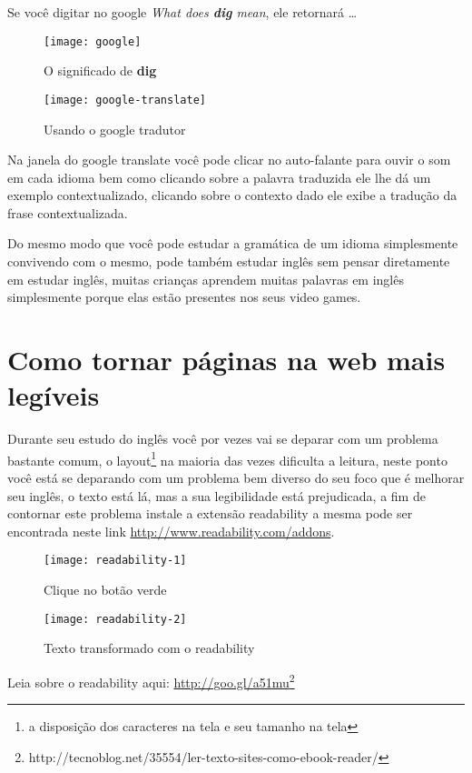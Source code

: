 \newpage
\noindent
Se você digitar no google {\em What does {\bf dig} mean}, ele retornará \dots

\begin{figure}[h!]
	\centering
	\caption {O significado de {\bf dig}}
	\texttt{[image: google]}
\end{figure}

\begin{figure}[h!]
	\centering
	\caption{Usando o google tradutor}
	\texttt{[image: google-translate]}
\end{figure}

\noindent
Na janela do google translate você pode clicar no auto-falante para ouvir
o som em cada idioma bem como clicando sobre a palavra traduzida ele lhe
dá um exemplo contextualizado, clicando sobre o contexto dado ele exibe
a tradução da frase contextualizada.

Do mesmo modo que você pode estudar a gramática de um idioma simplesmente
convivendo com o mesmo, pode também estudar inglês sem pensar diretamente em
estudar inglês, muitas crianças aprendem muitas palavras em inglês simplesmente
porque elas estão presentes nos seus video games.

\section{Como tornar páginas na web mais legíveis}

Durante seu estudo do inglês você por vezes vai se deparar com um problema
bastante comum, o layout\footnote{a disposição dos caracteres na tela e seu
tamanho na tela} na maioria das vezes dificulta a leitura, neste ponto você está se
deparando com um problema bem diverso do seu foco que é melhorar
seu inglês, o texto está lá, mas a sua legibilidade
está prejudicada, a fim de contornar este problema instale a extensão readability a mesma
pode ser encontrada neste link \href{http://www.readability.com/addons}{http://www.readability.com/addons}.

\begin{figure}[h!]
	\centering
	\caption{{\footnotesize Clique no botão verde}}
	\texttt{[image: readability-1]}
\end{figure}

\begin{figure}[h!]
	\centering
	\caption{{\footnotesize Texto transformado com o readability}}
	\texttt{[image: readability-2]}
\end{figure}

\begin{center}
{\footnotesize {}
Leia sobre o readability aqui: \href{http://tecnoblog.net/35554/ler-texto-sites-como-ebook-reader/}{http://goo.gl/a51mu}\footnote{http://tecnoblog.net/35554/ler-texto-sites-como-ebook-reader/}}
\end{center}


